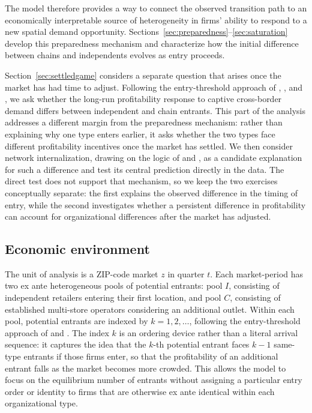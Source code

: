 \documentclass[english,12pt]{article}
\begin{document}
The model therefore provides a way to connect the observed transition path to an economically interpretable source of heterogeneity in firms' ability to respond to a new spatial demand opportunity. Sections~\ref{sec:preparedness}--\ref{sec:saturation} develop this preparedness mechanism and characterize how the initial difference between chains and independents evolves as entry proceeds.

Section~\ref{sec:settledgame} considers a separate question that arises once the market has had time to adjust. Following the entry-threshold approach of \citet{BresnahanReiss1991}, \citet{Mazzeo2002}, and \citet{Seim2006}, we ask whether the long-run profitability response to captive cross-border demand differs between independent and chain entrants. This part of the analysis addresses a different margin from the preparedness mechanism: rather than explaining why one type enters earlier, it asks whether the two types face different profitability incentives once the market has settled. We then consider network internalization, drawing on the logic of \citet{Nishida2008} and \citet{Holmes2011}, as a candidate explanation for such a difference and test its central prediction directly in the data. The direct test does not support that mechanism, so we keep the two exercises conceptually separate: the first explains the observed difference in the timing of entry, while the second investigates whether a persistent difference in profitability can account for organizational differences after the market has adjusted.


\subsection{Economic environment}
\label{sec:environment}

The unit of analysis is a ZIP-code market $z$ in quarter $t$. Each market-period has two ex ante heterogeneous pools of potential entrants: pool $I$, consisting of independent retailers entering their first location, and pool $C$, consisting of established multi-store operators considering an additional outlet. Within each pool, potential entrants are indexed by $k=1,2,\ldots$, following the entry-threshold approach of \citet{BresnahanReiss1990,BresnahanReiss1991} and \citet{Mazzeo2002}. The index $k$ is an ordering device rather than a literal arrival sequence: it captures the idea that the $k$-th potential entrant faces $k-1$ same-type entrants if those firms enter, so that the profitability of an additional entrant falls as the market becomes more crowded. This allows the model to focus on the equilibrium number of entrants without assigning a particular entry order or identity to firms that are otherwise ex ante identical within each organizational type.
\end{document}
